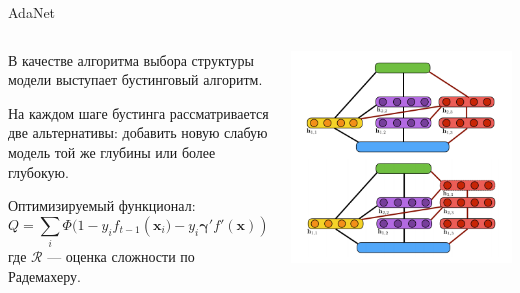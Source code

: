 \documentclass[10pt,pdf,utf8,russian,aspectratio=169]{beamer}
\begin{document}
\begin{frame}{AdaNet}
\begin{columns}[T] 
\begin{column}{.48\textwidth}
В качестве алгоритма выбора структуры модели выступает бустинговый алгоритм.

На каждом шаге бустинга рассматривается две альтернативы: добавить новую слабую модель той же глубины или более глубокую.

Оптимизируемый функционал:
\[
    Q = \sum_{i} \Phi(1- y_i f_{t-1}\left(\mathbf{x}_i)  - y_i \boldsymbol{\gamma}' f'(\mathbf{x})\right) + \mathcal{R},
\]
где $\mathcal{R}$ --- оценка сложности по Радемахеру.
\end{column}
\begin{column}{.48\textwidth}
\includegraphics[width=\textwidth]{adanet.png}
\end{column}
\end{columns}
\end{frame}
\end{document}
